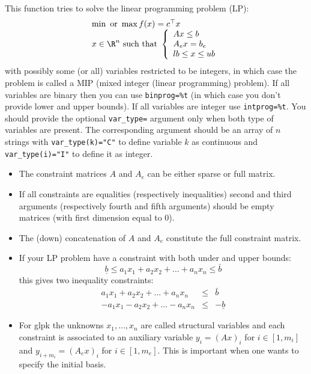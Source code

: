 \begin{mandescription}
This function tries to solve the linear programming problem (LP):
$$
\begin{array}{l}
\min \mbox{ or } \max f(x) = c^{\top} x\\
x \in \R^n \mbox{ such that } \left\{ \begin{array}{l} 
  A x \le b \\
  A_e x = b_e \\
  lb \le x \le ub 
\end{array}\right.
\end{array}
$$
with possibly some (or all) variables restricted to be integers, in which
case the problem is called a MIP (mixed integer (linear programming) problem).
If all variables are binary then you can use \verb+binprog=%t+ (in which case
you don't provide lower and upper bounds). If all variables are 
integer use \verb+intprog=%t+. You should provide the optional
\verb+var_type=+ argument only when both type of variables are
present.  The corresponding argument should be an array of $n$ strings 
with \verb+var_type(k)="C"+ to define variable $k$ as continuous 
and \verb+var_type(i)="I"+  to define it as integer.

\begin{itemize}
\item The constraint matrices $A$ and $A_e$ can be either sparse or full matrix.
\item If all constraints are equalities (respectively inequalities) second 
and third arguments (respectively fourth and fifth arguments) should 
be empty matrices (with first dimension equal to 0). 
\item The (down) concatenation of $A$ and $A_e$ constitute the full
constraint matrix.
\item If your LP problem have a constraint with both under and upper bounds:
$$
   \underline{b} \le a_1 x_1 + a_2 x_2 + \dots + a_n x_n \le \bar{b}
$$
this gives two inequality constraints:
$$
\begin{array}{rcl}
 a_1 x_1 + a_2 x_2 + \dots + a_n x_n  & \le & \bar{b}\\
 -a_1 x_1 - a_2 x_2 + \dots - a_n x_n &  \le & -\underline{b}
\end{array}
$$
\item For glpk the unknowns $x_1, \dots, x_n$ are called structural variables
and each constraint is associated to an auxiliary variable $y_i = (Ax)_i$ 
for $i \in [1,m_i]$ and $y_{i+m_i} = (A_ex)_i$ for  $i \in [1,m_e]$. This is
important when one wants to specify the initial basis.
\end{itemize}


\end{mandescription}
